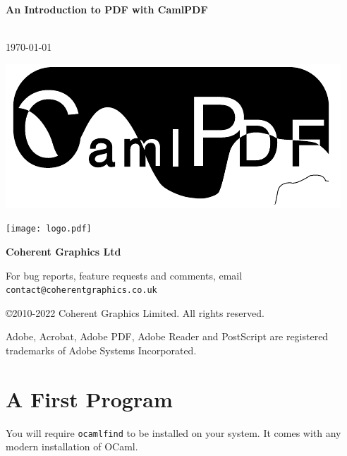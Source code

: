 \documentclass[a4paper]{memoir}
\newcommand{\smallgap}{\vspace{4mm}}
\begin{document}
\frontmatter
\thispagestyle{empty}

\begin{flushright}

{\sffamily \bfseries \Huge An Introduction to PDF with CamlPDF}

\vspace{4mm}{\LARGE John Whitington}\\ 
\vspace{3mm}\today

\smallgap

\includegraphics{CamlPDF-BW-Logo.pdf}

\vfill

\texttt{[image: logo.pdf]}

\vspace{2mm}
{\sffamily \bfseries \LARGE Coherent Graphics Ltd}

\end{flushright}

\clearpage

\thispagestyle{empty}
\noindent For bug reports, feature requests and comments, email\\ \texttt{contact@coherentgraphics.co.uk}

\vspace*{\fill}
\noindent\copyright 2010-2022 Coherent Graphics Limited. All rights reserved.

\smallgap 
\noindent Adobe, Acrobat, Adobe PDF, Adobe Reader and PostScript are
registered trademarks of Adobe Systems Incorporated.

\cleardoublepage

\mainmatter

\pagestyle{ruled}
\section*{A First Program}
You will require \texttt{ocamlfind} to be installed on your system. It comes with any modern installation of OCaml.
\end{document}
